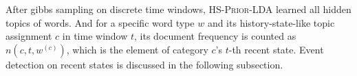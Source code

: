 \documentclass{article}
\begin{document}

After gibbs sampling on discrete time windows, \textsc{HS-Prior-LDA} learned all hidden topics of words.
And for a specific word type \(w\) and its history-state-like topic assignment \(c\) in time window \(t\), its document frequency is counted as \(n(c,t,w^{(c)})\), which is the element of category \(c\)'s \(t\)-th recent state.
Event detection on recent states is discussed in the following subsection.
\end{document}
